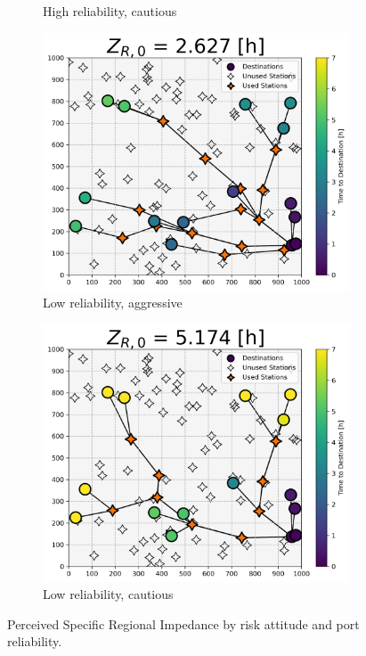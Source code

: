 \begin{figure}[H]
\begin{subfigure}[t]{.5\linewidth}
		\caption{High reliability, cautious}
	\end{subfigure}
	\begin{subfigure}[t]{.5\linewidth}
		\centering\captionsetup{width = .8\linewidth}
		\includegraphics[width = \linewidth]{figs/random_example_low_reliability_aggressive_perceived.png}
		\caption{Low reliability, aggressive}
	\end{subfigure}%
	\begin{subfigure}[t]{.5\linewidth}
		\centering\captionsetup{width = .8\linewidth}
		\includegraphics[width = \linewidth]{figs/random_example_low_reliability_cautious_perceived.png}
		\caption{Low reliability, cautious}
	\end{subfigure}
	\caption{Perceived Specific Regional Impedance by risk attitude and port reliability.}
	\label{fig:perceived_srta_random_perceived}
\end{figure}

